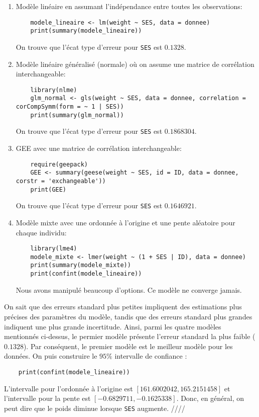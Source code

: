 \documentclass[../main.tex]{subfiles}
\begin{document}
\begin{CJK*}{UTF8}{gbsn}
\begin{enumerate}
    \item Modèle linéaire en assumant l'indépendance entre toutes les observations:

\begin{lstlisting}
    modele_lineaire <- lm(weight ~ SES, data = donnee)
    print(summary(modele_lineaire))  
\end{lstlisting}

On trouve que l'écat type d'erreur pour \texttt{SES} est $0.1328$.
    \item Modèle linéaire généralisé (normale) où on assume une matrice de corrélation interchangeable:

\begin{lstlisting}
    library(nlme)
    glm_normal <- gls(weight ~ SES, data = donnee, correlation = corCompSymm(form = ~ 1 | SES))
    print(summary(glm_normal)) 
\end{lstlisting}

On trouve que l'écat type d'erreur pour \texttt{SES} est $0.1868304$.
    \item GEE avec une matrice de corrélation interchangeable:
    
\begin{lstlisting}
    require(geepack)
    GEE <- summary(geese(weight ~ SES, id = ID, data = donnee, corstr = 'exchangeable'))
    print(GEE) 
\end{lstlisting}
On trouve que l'écat type d'erreur pour \texttt{SES} est $0.1646921$.

    \item Modèle mixte avec une ordonnée à l'origine et une pente aléatoire pour chaque individu:
\begin{lstlisting}
    library(lme4)
    modele_mixte <- lmer(weight ~ (1 + SES | ID), data = donnee)
    print(summary(modele_mixte)) 
    print(confint(modele_lineaire))
\end{lstlisting}
Nous avons manipulé beaucoup d'options. Ce modèle ne converge jamais. 
\end{enumerate}

On sait que des erreurs standard plus petites impliquent 
des estimations plus précises des paramètres du modèle, 
tandis que des erreurs standard plus grandes indiquent une plus grande incertitude. 
Ainsi, parmi les quatre modèles mentionnés ci-dessus, 
le permier modèle présente l'erreur standard la plus faible ($0.1328$).
Par conséquent, le premier modèle est le meilleur modèle pour les données.
On puis construire le $95 \%$ intervalle de confiance :

\begin{lstlisting}
    print(confint(modele_lineaire))
\end{lstlisting}

L'intervalle pour l'ordonnée à l'origine est $[161.6002042, 165.2151458]$
et l'intervalle pour la pente est $[-0.6829711, -0.1625338]$.
Donc, en général, on peut dire que le poids diminue lorsque \texttt{SES} augmente. ////

\end{CJK*}
\end{document}
